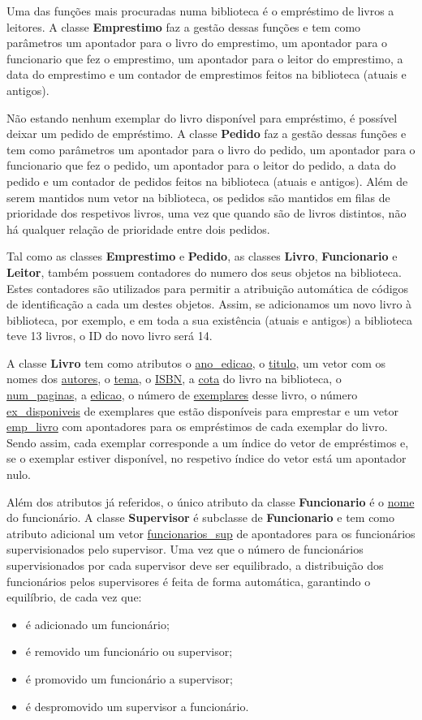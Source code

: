 \documentclass[12pt,a4paper,reqno]{report}
\numberwithin{figure}{section}
\numberwithin{equation}{section}
\begin{document}
Uma das funções mais procuradas numa biblioteca é o empréstimo de livros a leitores. A classe \textbf{Emprestimo} faz a gestão dessas funções e tem como parâmetros um apontador para o livro do emprestimo, um apontador para o funcionario que fez o emprestimo, um apontador para o leitor do emprestimo, a data do emprestimo e um contador de emprestimos feitos na biblioteca (atuais e antigos).

Não estando nenhum exemplar do livro disponível para empréstimo, é possível deixar um pedido de empréstimo. A classe \textbf{Pedido} faz a gestão dessas funções e tem como parâmetros um apontador para o livro do pedido, um apontador para o funcionario que fez o pedido, um apontador para o leitor do pedido, a data do pedido e um contador de pedidos feitos na biblioteca (atuais e antigos). Além de serem mantidos num vetor na biblioteca, os pedidos são mantidos em filas de prioridade dos respetivos livros, uma vez que quando são de livros distintos, não há qualquer relação de prioridade entre dois pedidos.

Tal como as classes \textbf{Emprestimo} e \textbf{Pedido}, as classes \textbf{Livro}, \textbf{Funcionario} e \textbf{Leitor}, também possuem contadores do numero dos seus objetos na biblioteca. Estes contadores são utilizados para permitir a atribuição automática de códigos de identificação a cada um destes objetos. Assim, se adicionamos um novo livro à biblioteca, por exemplo, e em toda a sua existência (atuais e antigos) a biblioteca teve 13 livros, o ID do novo livro será 14.

A classe \textbf{Livro} tem como atributos o \underline{ano\_edicao}, o \underline{titulo}, um vetor com os nomes dos \underline{autores}, o \underline{tema}, o \underline{ISBN}, a \underline{cota} do livro na biblioteca, o \underline{num\_paginas}, a \underline{edicao}, o número de \underline{exemplares} desse livro, o número \underline{ex\_disponiveis} de exemplares que estão disponíveis para emprestar e um vetor \underline{emp\_livro} com apontadores para os empréstimos de cada exemplar do livro. Sendo assim, cada exemplar corresponde a um índice do vetor de empréstimos e, se o exemplar estiver disponível, no respetivo índice do vetor está um apontador nulo.

Além dos atributos já referidos, o único atributo da classe \textbf{Funcionario} é o \underline{nome} do funcionário. A classe \textbf{Supervisor} é subclasse de \textbf{Funcionario} e tem como atributo adicional um vetor \underline{funcionarios\_sup} de apontadores para os funcionários supervisionados pelo supervisor. Uma vez que o número de funcionários supervisionados por cada supervisor deve ser equilibrado, a distribuição dos funcionários pelos supervisores é feita de forma automática, garantindo o equilíbrio, de cada vez que:
\begin{itemize}
	\item é adicionado um funcionário;
	\item é removido um funcionário ou supervisor;
	\item é promovido um funcionário a supervisor;
	\item é despromovido um supervisor a funcionário.
\end{itemize}
\end{document}
